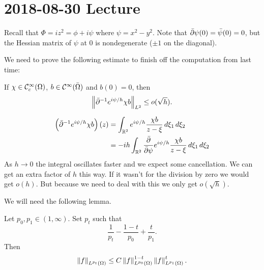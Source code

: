 \section{2018-08-30 Lecture}

Recall that $\Phi=iz^2=\phi+i\psi$ where $\psi=x^2-y^2$.
Note that $\bar{\partial}\psi(0)=\bar\psi(0)=0$, but the Hessian matrix of $\psi$ at $0$ is nondegenerate ($\pm 1$ on the diagonal).

We need to prove the following estimate to finish off the computation from last time:
\begin{prop}\label{10:prop}
  If $\chi\in\mathcal{C}_c^\infty(\Omega)$, $b\in\mathcal{C}^\infty(\bar\Omega)$ and $b(0)=0$, then
  \[ \left\lVert \bar{\partial}^{-1} e^{i\psi/h}\chi b \right\rVert_{L^2} \leq o(\sqrt{h}). \]
\end{prop}

\begin{rmk}[Intuition]
  \begin{align*}
    \left( \bar{\partial}^{-1} e^{i\psi/h}\chi b \right)(z) &= \int_{\mathbb{R}^2} e^{i\psi/h} \frac{\chi b}{z-\xi} \, d\xi_1 \, d\xi_2 \\
    &= -ih \int_{\mathbb{R}^2} \frac{\bar{\partial}}{\bar{\partial}\psi} e^{i\psi/h} \frac{\chi b}{z-\xi} \, d\xi_1 \, d\xi_2
  \end{align*}
  As $h \to 0$ the integral oscillates faster and we expect some cancellation.
  We can get an extra factor of $h$ this way.
  If it wasn't for the division by zero we would get $o(h)$.
  But because we need to deal with this we only get $o(\sqrt{h})$.
\end{rmk}

We will need the following lemma.

\begin{lem}\label{10:interp}
  Let $p_0,p_1\in(1,\infty)$.
  Set $p_t$ such that
  \[ \frac1{p_t} - \frac{1-t}{p_0}+\frac t{p_1}. \]
  Then
\[ \left\lVert f \right\rVert_{L^{p_t}(\Omega)} \leq C\left\lVert f \right\rVert_{L^{p_0}(\Omega)}^{1-t}\left\lVert f \right\rVert_{L^{p_1}(\Omega)}^t. \]
\end{lem}

